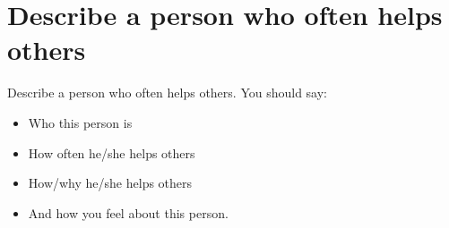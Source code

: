 \newpage

\section{Describe a person who often helps others}
\begin{ieltsprompt}
Describe a person who often helps others.
You should say:
\begin{itemize}[leftmargin=2em, itemsep=2pt]
\item Who this person is
\item How often he/she helps others
\item How/why he/she helps others
\item And how you feel about this person.
\end{itemize}
\end{ieltsprompt}
